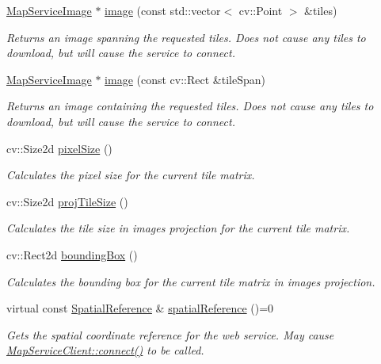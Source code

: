 \begin{DoxyCompactItemize}
\hyperlink{classdg_1_1deepcore_1_1imagery_1_1_map_service_image}{Map\+Service\+Image} $\ast$ \hyperlink{group___imagery_module_ga950285a4f5f5a45562210ca27fb91b29}{image} (const std\+::vector$<$ cv\+::\+Point $>$ \&tiles)
\begin{DoxyCompactList}\small\item\em Returns an image spanning the requested tiles. Does not cause any tiles to download, but will cause the service to connect. \end{DoxyCompactList}\item 
\hyperlink{classdg_1_1deepcore_1_1imagery_1_1_map_service_image}{Map\+Service\+Image} $\ast$ \hyperlink{group___imagery_module_gae8420c1898450274a950574a997d6ccd}{image} (const cv\+::\+Rect \&tile\+Span)
\begin{DoxyCompactList}\small\item\em Returns an image containing the requested tiles. Does not cause any tiles to download, but will cause the service to connect. \end{DoxyCompactList}\item 
cv\+::\+Size2d \hyperlink{group___imagery_module_ga00d806ed6fd8737d485ad2eb844701e7}{pixel\+Size} ()
\begin{DoxyCompactList}\small\item\em Calculates the pixel size for the current tile matrix. \end{DoxyCompactList}\item 
cv\+::\+Size2d \hyperlink{group___imagery_module_gab51c76e17b6432742a0eeb0d34fa21f1}{proj\+Tile\+Size} ()
\begin{DoxyCompactList}\small\item\em Calculates the tile size in image\textquotesingle{}s projection for the current tile matrix. \end{DoxyCompactList}\item 
cv\+::\+Rect2d \hyperlink{group___imagery_module_gad1f4f578c9e222b4cd709e9c2d370bb6}{bounding\+Box} ()
\begin{DoxyCompactList}\small\item\em Calculates the bounding box for the current tile matrix in image\textquotesingle{}s projection. \end{DoxyCompactList}\item 
virtual const \hyperlink{classdg_1_1deepcore_1_1imagery_1_1_spatial_reference}{Spatial\+Reference} \& \hyperlink{group___imagery_module_gadfaf375c95456bdf445d774f5dd24bbc}{spatial\+Reference} ()=0
\begin{DoxyCompactList}\small\item\em Gets the spatial coordinate reference for the web service. May cause \hyperlink{group___imagery_module_ga5e5f58c725cafba7966936f688a6ade0}{Map\+Service\+Client\+::connect()} to be called. \end{DoxyCompactList}\item 

\end{DoxyCompactItemize}
